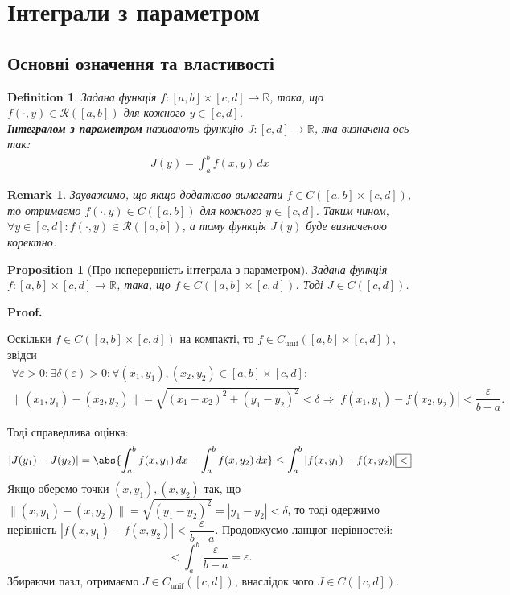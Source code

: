 \documentclass[a4paper, 10pt]{article}
\makeatletter
\def\huge{\displaystyle}
\theoremstyle{theoremdd}
\theoremstyle{theoremdd}
\theoremstyle{theoremdd}
\newtheorem{definition}[theorem]{Definition}
\theoremstyle{theoremdd}
\theoremstyle{theoremdd}
\theoremstyle{theoremdd}
\newtheorem{proposition}[theorem]{Proposition}
\theoremstyle{theoremdd}
\newtheorem{remark}[theorem]{Remark}
\theoremstyle{theoremdd}
\theoremstyle{theoremdd}
\renewenvironment{proof}[1][Proof.\\]{\par
\pushQED{\hfill \qed}%
\normalfont \topsep6\p@\@plus6\p@\relax
\trivlist
\item\relax
{\bfseries
#1\@addpunct{.}}\hspace\labelsep\ignorespaces
}{%
\popQED\endtrivlist\@endpefalse
}
\makeatother
\begin{document}
\newpage

\section{Інтеграли з параметром}
\subsection{Основні означення та властивості}
\begin{definition}
Задана функція $f \colon [a,b] \times [c,d] \to \mathbb{R}$, така, що $f(\cdot,y) \in \mathcal{R}([a,b])$ для кожного $y \in [c,d]$.\\
\textbf{Інтегралом з параметром} називають функцію $J \colon [c,d] \to \mathbb{R}$, яка визначена ось так:
\begin{align*}
J(y) = \int_a^b f(x,y)\,dx
\end{align*}
\end{definition}

\begin{remark}
Зауважимо, що якщо додатково вимагати $f \in C([a,b] \times [c,d])$, то отримаємо $f(\cdot,y) \in C([a,b])$ для кожного $y \in [c,d]$. Таким чином, $\forall y \in [c,d]: f(\cdot,y) \in \mathcal{R}([a,b])$, а тому функція $J(y)$ буде визначеною коректно.
\end{remark}

\begin{proposition}[Про неперервність інтеграла з параметром]
\label{continuity_of_parametric_integral}
Задана функція $f \colon [a,b] \times [c,d] \to \mathbb{R}$, така, що $f \in C([a,b] \times [c,d])$. Тоді $J \in C([c,d])$.
\end{proposition}

\begin{proof}
Оскільки $f \in C([a,b] \times [c,d])$ на компакті, то $f \in C_{\text{unif}}([a,b] \times [c,d])$, звідси
\begin{align*}
\forall \varepsilon > 0: \exists \delta(\varepsilon) > 0: \forall (x_1,y_1),(x_2,y_2) \in [a,b] \times [c,d]: \\
\|(x_1,y_1)-(x_2,y_2)\| = \sqrt{(x_1-x_2)^2 + (y_1-y_2)^2} < \delta \Rightarrow |f(x_1,y_1)-f(x_2,y_2)| < \dfrac{\varepsilon}{b-a}.
\end{align*}

Тоді справедлива оцінка:
\[
|J(y_1)-J(y_2)| = \abs{\int_a^b f(x,y_1)\,dx - \int_a^b f(x,y_2)\,dx} \leq \int_a^b |f(x,y_1)-f(x,y_2)| \boxed{<}
\]
Якщо оберемо точки $(x,y_1),(x,y_2)$ так, що $\|(x,y_1)-(x,y_2)\| = \sqrt{(y_1-y_2)^2} = |y_1-y_2|<\delta$, то тоді одержимо нерівність $|f(x,y_1)-f(x,y_2)| < \dfrac{\varepsilon}{b-a}$. Продовжуємо ланцюг нерівностей:
\[
\boxed{<} \huge \int_a^b \dfrac{\varepsilon}{b-a} = \varepsilon.
\]
Збираючи пазл, отримаємо $J \in C_{\text{unif}}([c,d])$, внаслідок чого $J \in C([c,d])$.
\end{proof}
\end{document}
